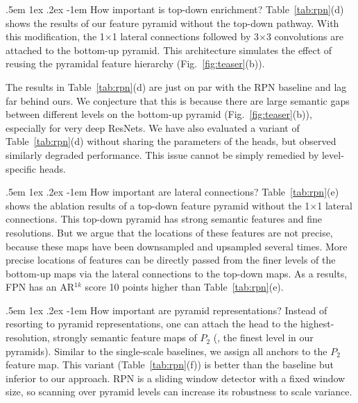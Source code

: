 \documentclass[10pt,twocolumn,letterpaper]{article}
\makeatletter
\renewcommand\paragraph{\@startsection{paragraph}{4}{\z@}%
  {.5em \@plus1ex \@minus.2ex}%
  {-1em}%
  {\normalfont\normalsize\bfseries}}
\makeatother
\begin{document}
\paragraph{How important is top-down enrichment?}
Table~\ref{tab:rpn}(d) shows the results of our feature pyramid without the top-down pathway.
With this modification, the 1$\times$1 lateral connections followed by 3$\times$3 convolutions are attached to the bottom-up pyramid.
This architecture simulates the effect of reusing the pyramidal feature hierarchy (Fig.~\ref{fig:teaser}(b)).

The results in Table~\ref{tab:rpn}(d) are just on par with the RPN baseline and lag far behind ours.
We conjecture that this is because there are large semantic gaps between different levels on the bottom-up pyramid (Fig.~\ref{fig:teaser}(b)), especially for very deep ResNets.
We have also evaluated a variant of Table~\ref{tab:rpn}(d) without sharing the parameters of the heads, but observed similarly degraded performance.
This issue cannot be simply remedied by level-specific heads.

\paragraph{How important are lateral connections?}
Table~\ref{tab:rpn}(e) shows the ablation results of a top-down feature pyramid without the 1$\times$1 lateral connections.
This top-down pyramid has strong semantic features and fine resolutions.
But we argue that the locations of these features are not precise, because these maps have been downsampled and upsampled several times.
More precise locations of features can be directly passed from the finer levels of the bottom-up maps via the lateral connections to the top-down maps.
As a results, FPN has an AR$^{1k}$ score 10 points higher than Table~\ref{tab:rpn}(e).

\paragraph{How important are pyramid representations?}
Instead of resorting to pyramid representations, one can attach the head to the highest-resolution, strongly semantic feature maps of $P_2$ (\ie, the finest level in our pyramids).
Similar to the single-scale baselines, we assign all anchors to the $P_2$ feature map.
This variant (Table~\ref{tab:rpn}(f)) is better than the baseline but inferior to our approach.
RPN is a sliding window detector with a fixed window size, so scanning over pyramid levels can increase its robustness to scale variance.
\end{document}
